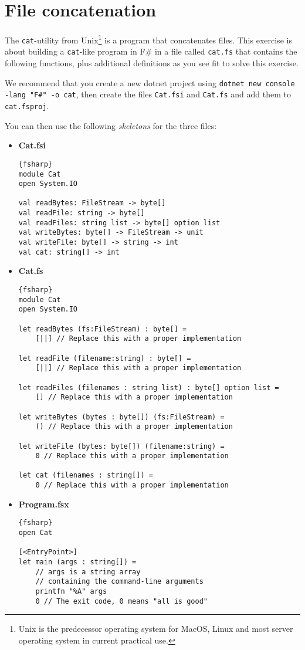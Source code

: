 \section*{File concatenation}

The \texttt{cat}-utility from 
Unix\footnote{Unix is the predecessor operating system for MacOS, Linux and most server operating system in current practical use.} 
is a program that concatenates files.  
This exercise is about building a \texttt{cat}-like program in F\# in a file called \texttt{cat.fs} that contains the following functions, plus additional definitions as you see fit to solve this exercise.

We recommend that you create a new dotnet project using \texttt{dotnet new console -lang "F\#" -o cat}, then create the files \texttt{Cat.fsi} and \texttt{Cat.fs} and add them to \texttt{cat.fsproj}.


You can then use the following \textit{skeletons} for the three files:

\begin{itemize}
\item \textbf{Cat.fsi} \\
  \begin{lstlisting}{fsharp}
module Cat
open System.IO

val readBytes: FileStream -> byte[]
val readFile: string -> byte[]
val readFiles: string list -> byte[] option list
val writeBytes: byte[] -> FileStream -> unit
val writeFile: byte[] -> string -> int
val cat: string[] -> int
  \end{lstlisting}
\item \textbf{Cat.fs} \\
  \begin{lstlisting}{fsharp}
module Cat
open System.IO

let readBytes (fs:FileStream) : byte[] =
    [||] // Replace this with a proper implementation

let readFile (filename:string) : byte[] =
    [||] // Replace this with a proper implementation

let readFiles (filenames : string list) : byte[] option list =
    [] // Replace this with a proper implementation

let writeBytes (bytes : byte[]) (fs:FileStream) =
    () // Replace this with a proper implementation

let writeFile (bytes: byte[]) (filename:string) =
    0 // Replace this with a proper implementation

let cat (filenames : string[]) =
    0 // Replace this with a proper implementation
  \end{lstlisting}
\item \textbf{Program.fsx} \\
  \begin{lstlisting}{fsharp}
open Cat

[<EntryPoint>]
let main (args : string[]) =
    // args is a string array
    // containing the command-line arguments
    printfn "%A" args 
    0 // The exit code, 0 means "all is good"
  \end{lstlisting}
\end{itemize}
